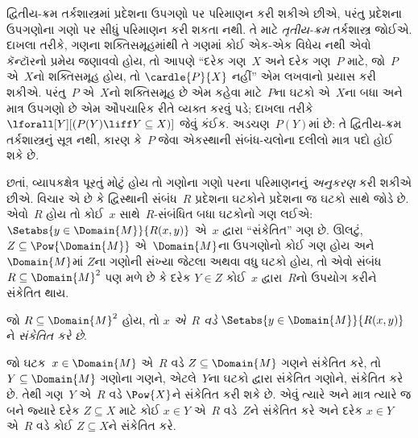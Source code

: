 \begingroup
\makeatletter{}\makeatother


\label{guunit:OLP-0340}


\begin{explain}
દ્વિતીય-ક્રમ તર્કશાસ્ત્રમાં પ્રદેશના ઉપગણો પર પરિમાણન કરી
શકીએ છીએ, પરંતુ પ્રદેશના ઉપગણોના ગણો પર સીધું પરિમાણન કરી
શકતા નથી. તે માટે \emph{તૃતીય-ક્રમ} તર્કશાસ્ત્ર જોઈએ. દાખલા તરીકે,
ગણના શક્તિસમૂહમાંથી તે ગણમાં કોઈ એક-એક વિધેય નથી એવો
કૅન્ટૉરનો પ્રમેય જણાવવો હોય, તો આપણે ``દરેક ગણ~$X$ અને દરેક
ગણ~$P$ માટે, જો~$P$ એ~$X$નો શક્તિસમૂહ હોય, તો
$\cardle{P}{X}$ નહીં'' એમ લખવાનો પ્રયાસ કરી શકીએ. પરંતુ~$P$
એ~$X$નો શક્તિસમૂહ છે એમ કહેવા માટે~$P$ના ઘટકો એ~$X$ના
બધા અને માત્ર ઉપગણો છે એમ ઔપચારિક રીતે વ્યક્ત કરવું પડે; દાખલા
તરીકે $\lforall[Y][(P(Y) \liff Y \subseteq X)]$ જેવું કંઈક.
અડચણ~$P(Y)$માં છે: તે દ્વિતીય-ક્રમ તર્કશાસ્ત્રનું સૂત્ર
નથી, કારણ કે~$P$ જેવા એકસ્થાની સંબંધ-ચલોના દલીલો માત્ર પદો હોઈ
શકે છે.

છતાં, વ્યાપકક્ષેત્ર પૂરતું મોટું હોય તો ગણોના ગણો પરના પરિમાણનનું
\emph{અનુકરણ} કરી શકીએ છીએ. વિચાર એ છે કે દ્વિસ્થાની સંબંધ~$R$
પ્રદેશના ઘટકોને પ્રદેશના જ ઘટકો સાથે જોડે છે.
એવો~$R$ હોય તો કોઈ~$x$ સાથે~$R$-સંબંધિત બધા ઘટકોનો ગણ લઈએ:
$\Setabs{y \in \Domain{M}}{R(x,y)}$ એ~$x$ દ્વારા
``સંકેતિત'' ગણ છે. ઊલટું, $Z \subseteq \Pow{\Domain{M}}$
એ~$\Domain{M}$ના ઉપગણોનો કોઈ ગણ હોય અને~$\Domain{M}$માં
$Z$ના ગણોની સંખ્યા જેટલા અથવા વધુ ઘટકો હોય, તો એવો
સંબંધ~$R \subseteq \Domain{M}^2$ પણ મળે છે કે દરેક $Y \in Z$
કોઈ~$x$ દ્વારા~$R$નો ઉપયોગ કરીને સંકેતિત થાય.
\end{explain}

\begin{defn}
જો $R \subseteq \Domain{M}^2$ હોય, તો \emph{$x$ એ~$R$ વડે}
$\Setabs{y \in \Domain{M}}{R(x, y)}$ને \emph{સંકેતિત કરે છે}.
\end{defn}

જો ઘટક~$x \in \Domain{M}$ એ~$R$ વડે
$Z \subseteq \Domain{M}$ ગણને સંકેતિત કરે, તો
$Y \subseteq \Domain{M}$ ગણોના ગણને, એટલે~$Y$ના ઘટકો
દ્વારા સંકેતિત ગણોને, સંકેતિત કરે છે. તેથી ગણ~$Y$ એ~$R$ વડે
$\Pow{X}$ને સંકેતિત કરી શકે છે. એવું ત્યારે અને માત્ર ત્યારે જ બને
જ્યારે દરેક $Z \subseteq X$ માટે કોઈ $x \in Y$ એ~$R$ વડે~$Z$ને
સંકેતિત કરે અને દરેક $x \in Y$ એ~$R$ વડે કોઈ $Z \subseteq X$ને
સંકેતિત કરે.

